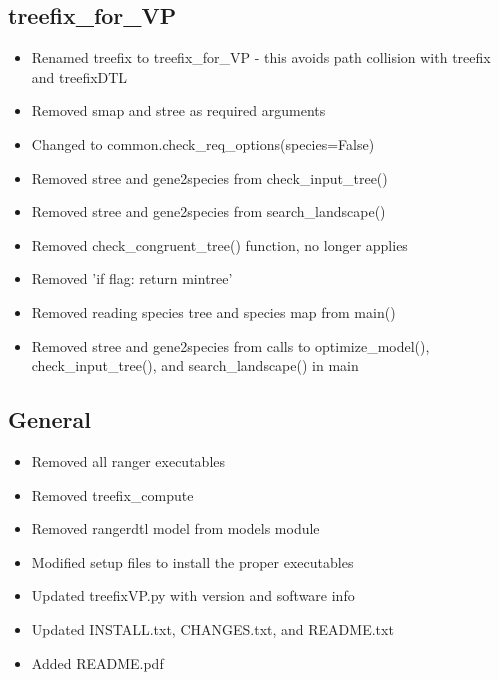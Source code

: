 \documentclass[12pt]{article}
\begin{document}
\subsection{treefix{\_}for{\_}VP}
\begin{itemize}
    \item Renamed treefix to treefix{\_}for{\_}VP - this avoids path collision with treefix and treefixDTL
    \item Removed smap and stree as required arguments
    \item Changed to common.check{\_}req{\_}options(species=False)
    \item Removed stree and gene2species from check{\_}input{\_}tree()
    \item Removed stree and gene2species from search{\_}landscape()
    \item Removed check{\_}congruent{\_}tree() function, no longer applies
    \item Removed 'if flag: return mintree'
    \item Removed reading species tree and species map from main()
    \item Removed stree and gene2species from calls to optimize{\_}model(), check{\_}input{\_}tree(), and search{\_}landscape() in main
\end{itemize}

\subsection{General}
\begin{itemize}
    \item Removed all ranger executables
    \item Removed treefix{\_}compute
    \item Removed rangerdtl model from models module
    \item Modified setup files to install the proper executables
    \item Updated treefixVP.py with version and software info
    \item Updated INSTALL.txt, CHANGES.txt, and README.txt
    \item Added README.pdf
\end{itemize}
\end{document}
